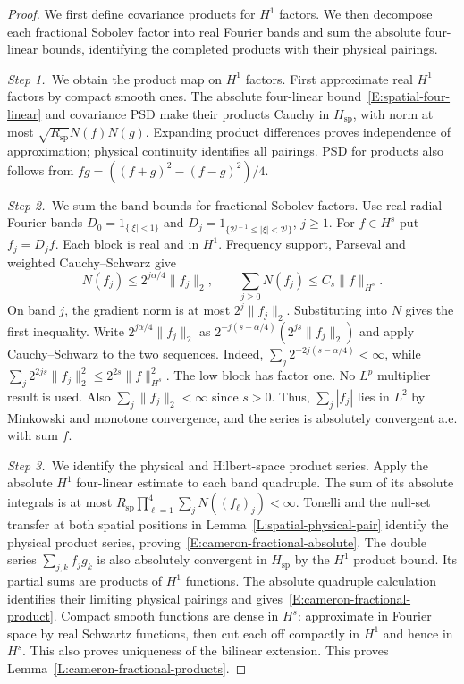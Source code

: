 \begin{proof}
  We first define covariance products for $H^1$ factors. We then decompose
  each fractional Sobolev factor into real Fourier bands and sum the absolute
  four-linear bounds, identifying the completed products with their physical
  pairings.


  \medskip
  \noindent\textit{Step 1.~}We obtain the product map on $H^1$ factors.
  First approximate real $H^1$ factors by compact smooth ones. The absolute
  four-linear bound~\eqref{E:spatial-four-linear} and covariance PSD make their
  products Cauchy in $H_{\mathrm{sp}}$, with norm at most
  $\sqrt{R_{\mathrm{sp}}}N(f)N(g)$. Expanding product differences proves
  independence of approximation; physical continuity identifies all pairings.
  PSD for products also follows from $fg = ((f+g)^2-(f-g)^2)/4$.


  \medskip
  \noindent\textit{Step 2.~}We sum the band bounds for fractional Sobolev
  factors.
  Use real radial Fourier bands $D_0 = 1_{\{|\xi|<1\}}$ and $D_j =
  1_{\{2^{j-1}\le|\xi|<2^j\}}$, $j \ge 1$. For $f \in H^s$ put $f_j = D_jf$.
  Each block is real and in $H^1$. Frequency support, Parseval and weighted
  Cauchy--Schwarz give
  \begin{equation}\label{E:cameron-dyadic-product}
    N(f_j)\le2^{j\alpha/4}\|f_j\|_2,\qquad
    \sum_{j\ge0}N(f_j)\le C_s\|f\|_{H^s}.
  \end{equation}
  On band $j$, the gradient norm is at most $2^j\|f_j\|_2$. Substituting into
  $N$ gives the first inequality. Write $2^{j\alpha/4}\|f_j\|_2$ as
  $2^{-j(s-\alpha/4)}(2^{js}\|f_j\|_2)$ and apply Cauchy--Schwarz to the two
  sequences.
  Indeed, $\sum_j2^{-2j(s-\alpha/4)} < \infty$, while $\sum_j2^{2js}\|f_j\|_2^2
  \le 2^{2s}\|f\|_{H^s}^2$. The low block has factor one. No $L^p$ multiplier
  result is used. Also $\sum_j\|f_j\|_2 < \infty$ since $s > 0$. Thus,
  $\sum_j|f_j|$ lies in $L^2$ by Minkowski and monotone convergence, and the
  series is absolutely convergent a.e. with sum $f$.


  \medskip
  \noindent\textit{Step 3.~}We identify the physical and Hilbert-space product
  series.
  Apply the absolute $H^1$ four-linear estimate to each band quadruple. The sum
  of its absolute integrals is at most
  $R_{\mathrm{sp}}\prod_{\ell=1}^4\sum_jN((f_\ell)_j) < \infty$. Tonelli and the
  null-set transfer at both spatial positions in
  Lemma~\ref{L:spatial-physical-pair} identify the physical product series,
  proving~\eqref{E:cameron-fractional-absolute}. The double series
  $\sum_{j,k}f_jg_k$ is also absolutely convergent in $H_{\mathrm{sp}}$ by the
  $H^1$ product bound. Its partial sums are products of $H^1$ functions. The
  absolute quadruple calculation identifies their limiting physical pairings and
  gives~\eqref{E:cameron-fractional-product}. Compact smooth functions are dense
  in $H^s$: approximate in Fourier space by real Schwartz functions, then cut
  each off compactly in $H^1$ and hence in $H^s$. This also proves uniqueness of
  the bilinear extension. This proves Lemma~\ref{L:cameron-fractional-products}.
\end{proof}

